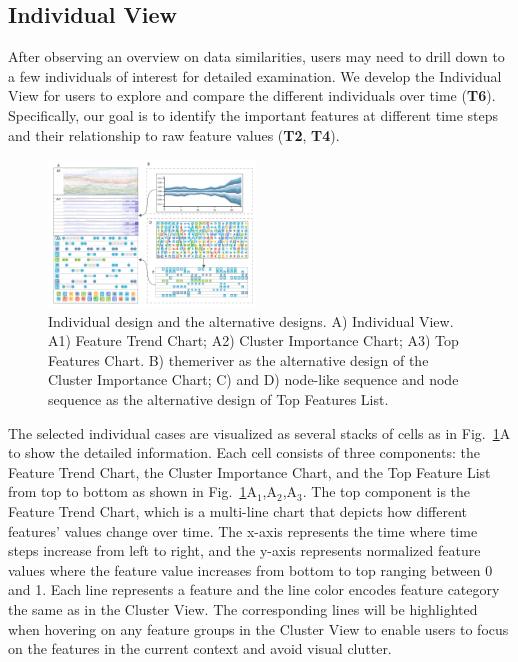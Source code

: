 \subsection{Individual View}
After observing an overview on data similarities, users may need to drill down to a few individuals of interest for detailed examination.
We develop the Individual View for users to explore and compare the different individuals over time (\textbf{T6}).
Specifically, our goal is to identify the important features at different time steps and their relationship to raw feature values (\textbf{T2}, \textbf{T4}).


\begin{figure}[t]
	\centering
    \includegraphics[width=0.49\textwidth]{pictures/design/alternative_design.pdf}
	\vspace{-3mm}
	\caption{Individual design and the alternative designs. A) Individual View. A1) Feature Trend Chart; A2) Cluster Importance Chart; A3) Top Features Chart. B) themeriver as the alternative design of the Cluster Importance Chart; C) and D) node-like sequence and node sequence as the alternative design of Top Features List.}
	\label{fig:individual_view}
	\vspace{-4mm}
\end{figure}


The selected individual cases are visualized as several stacks of cells as in Fig.~\ref{fig:individual_view}A to show the detailed information.
Each cell consists of three components: the Feature Trend Chart, the Cluster Importance Chart, and the Top Feature List from top to bottom as shown in Fig.~\ref{fig:individual_view}A$_1$,A$_2$,A$_3$.
The top component is the Feature Trend Chart, which is a multi-line chart that depicts how different features' values change over time. 
The x-axis represents the time where time steps increase from left to right, and the y-axis represents normalized feature values where the feature value increases from bottom to top ranging between 0 and 1.
Each line represents a feature and the line color encodes feature category the same as in the Cluster View.
The corresponding lines will be highlighted when hovering on any feature groups in the Cluster View to enable users to focus on the features in the current context and avoid visual clutter.

